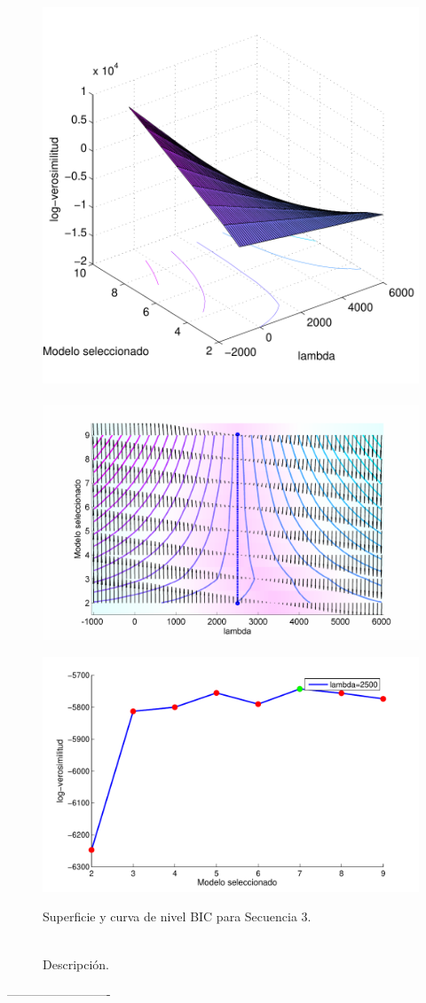 \begin{figure}[H]
  \centerline  
  {\includegraphics[width=0.55\linewidth]{gfx/chap6/learbic1} ~
   \includegraphics[width=0.5\linewidth]{gfx/chap6/learbic2} }
  \centerline  
  {\includegraphics[width=0.4\linewidth]{gfx/chap6/learbic3}
  } \quad
  \caption{Superficie y curva de nivel BIC para Secuencia 3.}
  \caption*{\\Descripción.}
  \label{fig:prb1_sup}
\end{figure}

-------------------------

